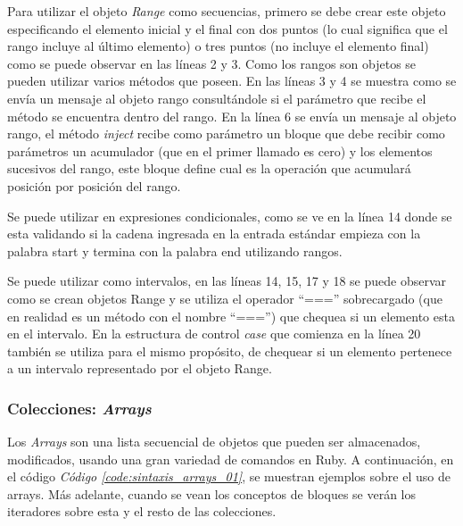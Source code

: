 \documentclass{article}
\newcommand{\refcode}[1]{\textit{Código \ref{#1}}}
\begin{document}
	Para utilizar el objeto \textit{Range} como secuencias, primero se debe crear este objeto especificando el elemento inicial y el final con dos puntos (lo cual significa que el rango incluye al último elemento) o tres puntos (no incluye el elemento final) como se puede observar en las líneas 2 y 3. Como los rangos son objetos se pueden utilizar varios métodos que poseen. En las líneas 3 y 4 se muestra como se envía un mensaje al objeto rango consultándole si el parámetro que recibe el método se encuentra dentro del rango. En la línea 6 se envía un mensaje al objeto rango, el método \textit{inject} recibe como parámetro un bloque que debe recibir como parámetros un acumulador (que en el primer llamado es cero) y los elementos sucesivos del rango, este bloque define cual es la operación que acumulará posición por posición del rango.
	\par
	Se puede utilizar en expresiones condicionales, como se ve en la línea 14 donde se esta validando si la cadena ingresada en la entrada estándar empieza con la palabra start y termina con la palabra end  utilizando rangos.
	\par
	Se puede utilizar como intervalos, en las líneas 14, 15, 17 y 18 se puede observar como se crean objetos Range y se utiliza el operador ``==='' sobrecargado (que en realidad es un método con el nombre ``==='') que chequea si un elemento esta en el intervalo. En la estructura de control \textit{case} que comienza en la línea 20 también se utiliza para el mismo propósito, de chequear si un elemento pertenece a un intervalo representado por el objeto Range.
\bigskip



\subsubsection{Colecciones: \textit{Arrays}}
	
	Los \textit{Arrays} son una lista secuencial de objetos que pueden ser almacenados,  modificados,  usando una gran variedad de comandos en Ruby. A continuación, en el código \refcode{code:sintaxis_arrays_01}, se muestran ejemplos sobre el uso de arrays. Más adelante, cuando se vean los conceptos de bloques se verán los iteradores sobre esta y el resto de las colecciones.

 
\bigskip
\end{document}
